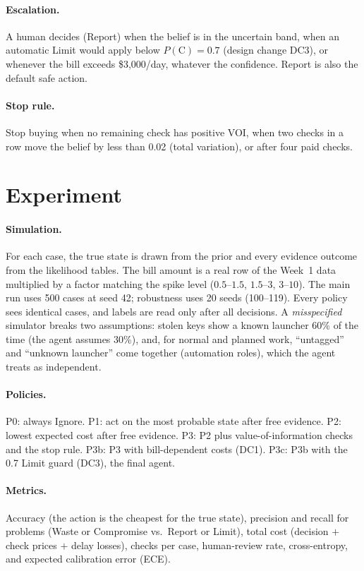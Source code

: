 \documentclass{article}
\newcommand{\Pc}{P(\mathrm{C})}
\begin{document}
\paragraph{Escalation.} A human decides (Report) when the belief is in the uncertain band, when an automatic Limit would apply below $\Pc = 0.7$ (design change DC3), or whenever the bill exceeds \$3,000/day, whatever the confidence. Report is also the default safe action.

\paragraph{Stop rule.} Stop buying when no remaining check has positive VOI, when two checks in a row move the belief by less than 0.02 (total variation), or after four paid checks.

\section{Experiment}

\paragraph{Simulation.} For each case, the true state is drawn from the prior and every evidence outcome from the likelihood tables. The bill amount is a real row of the Week~1 data multiplied by a factor matching the spike level ($0.5$--$1.5$, $1.5$--$3$, $3$--$10$). The main run uses 500 cases at seed 42; robustness uses 20 seeds (100--119). Every policy sees identical cases, and labels are read only after all decisions. A \emph{misspecified} simulator breaks two assumptions: stolen keys show a known launcher 60\% of the time (the agent assumes 30\%), and, for normal and planned work, ``untagged'' and ``unknown launcher'' come together (automation roles), which the agent treats as independent.

\paragraph{Policies.} P0: always Ignore. P1: act on the most probable state after free evidence. P2: lowest expected cost after free evidence. P3: P2 plus value-of-information checks and the stop rule. P3b: P3 with bill-dependent costs (DC1). P3c: P3b with the 0.7 Limit guard (DC3), the final agent.

\paragraph{Metrics.} Accuracy (the action is the cheapest for the true state), precision and recall for problems (Waste or Compromise vs.\ Report or Limit), total cost (decision $+$ check prices $+$ delay losses), checks per case, human-review rate, cross-entropy, and expected calibration error (ECE).
\end{document}
